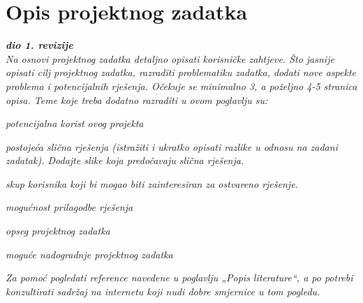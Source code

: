 \chapter{Opis projektnog zadatka}
	
	\textbf{\textit{dio 1. revizije}}\\
	
	\textit{Na osnovi projektnog zadatka detaljno opisati korisničke zahtjeve. Što jasnije opisati cilj projektnog zadatka, razraditi problematiku zadatka, dodati nove aspekte problema i potencijalnih rješenja. Očekuje se minimalno 3, a poželjno 4-5 stranica opisa.	Teme koje treba dodatno razraditi u ovom poglavlju su:}
	\begin{packed_item}
		\item \textit{potencijalna korist ovog projekta}
		\item \textit{postojeća slična rješenja (istražiti i ukratko opisati razlike u odnosu na zadani zadatak). Dodajte slike koja predočavaju slična rješenja.}
		\item \textit{skup korisnika koji bi mogao biti zainteresiran za ostvareno rješenje.}
		\item \textit{mogućnost prilagodbe rješenja }
		\item \textit{opseg projektnog zadatka}
		\item \textit{moguće nadogradnje projektnog zadatka}
	\end{packed_item}
	
	\textit{Za pomoć pogledati reference navedene u poglavlju „Popis literature“, a po potrebi konzultirati sadržaj na internetu koji nudi dobre smjernice u tom pogledu.}

	\eject
